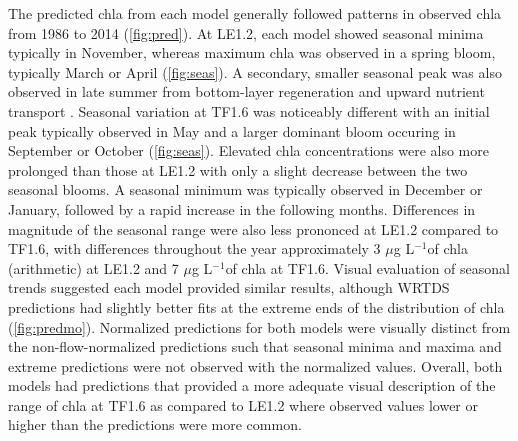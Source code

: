 \documentclass{svjour3}\usepackage[]{graphicx}\usepackage[]{color}
\newcommand{\mugl}{$\mu$g L$^{-1}$}
\begin{document}
The predicted \ac{chla} from each model generally followed patterns in observed \ac{chla} from 1986 to 2014 (\cref{fig:pred}).  At LE1.2, each model showed seasonal minima typically in November, whereas maximum \ac{chla} was observed in a spring bloom, typically March or April (\cref{fig:seas}).  A secondary, smaller seasonal peak was also observed in late summer from bottom-layer regeneration and upward nutrient transport \cite{Testa08a}.  Seasonal variation at TF1.6 was noticeably different with an initial peak typically observed in May and a larger dominant bloom occuring in September or October (\cref{fig:seas}).  Elevated \ac{chla}  concentrations were also more prolonged than those at LE1.2 with only a slight decrease between the two seasonal blooms.  A seasonal minimum was typically observed in December or January, followed by a rapid increase in the following months.  Differences in magnitude of the seasonal range were also less prononced at LE1.2 compared to TF1.6, with differences throughout the year approximately 3 \mugl of \ac{chla} (arithmetic) at LE1.2 and 7 \mugl of \ac{chla} at TF1.6. Visual evaluation of seasonal trends suggested each model provided similar results, although \ac{WRTDS} predictions had slightly better fits at the extreme ends of the distribution of \ac{chla} (\cref{fig:predmo}).  Normalized predictions for both models were visually distinct from the non-flow-normalized predictions such that seasonal minima and maxima and extreme predictions were not observed with the normalized values.  Overall, both models had predictions that provided a more adequate visual description of the range of \ac{chla} at TF1.6 as compared to LE1.2 where observed values lower or higher than the predictions were more common.  
\end{document}
